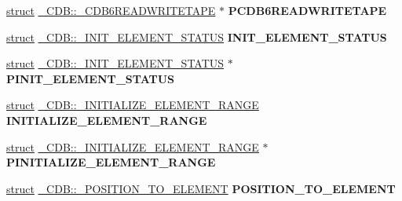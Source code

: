 \begin{DoxyCompactItemize}
\hyperlink{interfacestruct}{struct} \hyperlink{struct___c_d_b_1_1___c_d_b6_r_e_a_d_w_r_i_t_e_t_a_p_e}{\+\_\+\+C\+D\+B\+::\+\_\+\+C\+D\+B6\+R\+E\+A\+D\+W\+R\+I\+T\+E\+T\+A\+PE} $\ast$ {\bfseries P\+C\+D\+B6\+R\+E\+A\+D\+W\+R\+I\+T\+E\+T\+A\+PE}
\item 
\mbox{\label{union___c_d_b_a8bc76ddd330b4f802cea70b06a67d3d2}} 
\hyperlink{interfacestruct}{struct} \hyperlink{struct___c_d_b_1_1___i_n_i_t___e_l_e_m_e_n_t___s_t_a_t_u_s}{\+\_\+\+C\+D\+B\+::\+\_\+\+I\+N\+I\+T\+\_\+\+E\+L\+E\+M\+E\+N\+T\+\_\+\+S\+T\+A\+T\+US} {\bfseries I\+N\+I\+T\+\_\+\+E\+L\+E\+M\+E\+N\+T\+\_\+\+S\+T\+A\+T\+US}
\item 
\mbox{\label{union___c_d_b_afc8de18464bd385375944ecd8ca5b0f4}} 
\hyperlink{interfacestruct}{struct} \hyperlink{struct___c_d_b_1_1___i_n_i_t___e_l_e_m_e_n_t___s_t_a_t_u_s}{\+\_\+\+C\+D\+B\+::\+\_\+\+I\+N\+I\+T\+\_\+\+E\+L\+E\+M\+E\+N\+T\+\_\+\+S\+T\+A\+T\+US} $\ast$ {\bfseries P\+I\+N\+I\+T\+\_\+\+E\+L\+E\+M\+E\+N\+T\+\_\+\+S\+T\+A\+T\+US}
\item 
\mbox{\label{union___c_d_b_a8c766fa312b86ba35fcabf39b42a8806}} 
\hyperlink{interfacestruct}{struct} \hyperlink{struct___c_d_b_1_1___i_n_i_t_i_a_l_i_z_e___e_l_e_m_e_n_t___r_a_n_g_e}{\+\_\+\+C\+D\+B\+::\+\_\+\+I\+N\+I\+T\+I\+A\+L\+I\+Z\+E\+\_\+\+E\+L\+E\+M\+E\+N\+T\+\_\+\+R\+A\+N\+GE} {\bfseries I\+N\+I\+T\+I\+A\+L\+I\+Z\+E\+\_\+\+E\+L\+E\+M\+E\+N\+T\+\_\+\+R\+A\+N\+GE}
\item 
\mbox{\label{union___c_d_b_a1084843ac7c31031a03a562f63770537}} 
\hyperlink{interfacestruct}{struct} \hyperlink{struct___c_d_b_1_1___i_n_i_t_i_a_l_i_z_e___e_l_e_m_e_n_t___r_a_n_g_e}{\+\_\+\+C\+D\+B\+::\+\_\+\+I\+N\+I\+T\+I\+A\+L\+I\+Z\+E\+\_\+\+E\+L\+E\+M\+E\+N\+T\+\_\+\+R\+A\+N\+GE} $\ast$ {\bfseries P\+I\+N\+I\+T\+I\+A\+L\+I\+Z\+E\+\_\+\+E\+L\+E\+M\+E\+N\+T\+\_\+\+R\+A\+N\+GE}
\item 
\mbox{\label{union___c_d_b_ab4c2cdff1a1c813447dd351d3444cee1}} 
\hyperlink{interfacestruct}{struct} \hyperlink{struct___c_d_b_1_1___p_o_s_i_t_i_o_n___t_o___e_l_e_m_e_n_t}{\+\_\+\+C\+D\+B\+::\+\_\+\+P\+O\+S\+I\+T\+I\+O\+N\+\_\+\+T\+O\+\_\+\+E\+L\+E\+M\+E\+NT} {\bfseries P\+O\+S\+I\+T\+I\+O\+N\+\_\+\+T\+O\+\_\+\+E\+L\+E\+M\+E\+NT}
\item 
\mbox{\label{union___c_d_b_a3e5786c69f23a7539f299a64df0eff78}} 

\end{DoxyCompactItemize}
